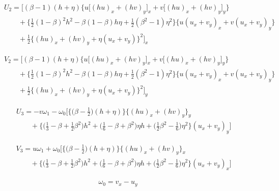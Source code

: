 \documentclass[11pt]{article}
\begin{document}
\begin{eqnarray}
&&U_2=\bigg[
        (\beta-1)(h+\eta) \Big\{
        u \big[ (hu)_x + (hv)_y \big]_x +  v \big[ (hu)_x + (hv)_y \big]_y \Big\}
         \nonumber \\
&& \quad \quad
        +\bigg\{ \frac{1}{2} (1-\beta)^2 h^2 - \beta (1-\beta) h \eta + \frac{1}{2} (\beta^2-1) \eta^2 \bigg\}
        \Big\{ u (u_x+v_y)_x + v(u_x+v_y)_y \Big\}   \nonumber  \\
&& \quad \quad
        +\frac{1}{2} \Big\{
        (hu)_x + (hv)_y + \eta (u_x+v_y)
        \Big\}^2
      \bigg]_x
\end{eqnarray}

\begin{eqnarray}
&&V_2=\bigg[
        (\beta-1)(h+\eta) \Big\{
        u \big[ (hu)_x + (hv)_y \big]_x +  v \big[ (hu)_x + (hv)_y \big]_y \Big\}
         \nonumber \\
&& \quad \quad
        +\bigg\{ \frac{1}{2} (1-\beta)^2 h^2 - \beta (1-\beta) h \eta + \frac{1}{2} (\beta^2-1) \eta^2 \bigg\}
        \Big\{ u (u_x+v_y)_x + v(u_x+v_y)_y \Big\}   \nonumber  \\
&& \quad \quad
        +\frac{1}{2} \Big\{
        (hu)_x + (hv)_y + \eta (u_x+v_y)
        \Big\}^2
      \bigg]_y
\end{eqnarray}

\begin{eqnarray}
&&U_3=-v \omega_1 - \omega_0 \bigg[ \Big\{ \big(
      \beta - \frac{1}{2} \big) (h+\eta) \Big\}
      \Big\{ (hu)_x + (hv)_y \Big\}_y   \nonumber \\
&& \quad \quad
      +
      \Big\{
        \big( \frac{1}{3} - \beta + \frac{1}{2} \beta^2 \big) h^2
      + \big( \frac{1}{6} - \beta + \beta^2 \big) \eta h
      + \big( \frac{1}{2} \beta^2 - \frac{1}{6} \big) \eta^2
      \Big\}
      (u_x+v_y)_y
      \bigg]
\end{eqnarray}

\begin{eqnarray}
&&V_3=u \omega_1 + \omega_0 \bigg[ \Big\{ \big(
      \beta - \frac{1}{2} \big) (h+\eta) \Big\}
      \Big\{ (hu)_x + (hv)_y \Big\}_x   \nonumber \\
&& \quad \quad
      +
      \Big\{
        \big( \frac{1}{3} - \beta + \frac{1}{2} \beta^2 \big) h^2
      + \big( \frac{1}{6} - \beta + \beta^2 \big) \eta h
      + \big( \frac{1}{2} \beta^2 - \frac{1}{6} \big) \eta^2
      \Big\}
      (u_x+v_y)_x
      \bigg]
\end{eqnarray}

\begin{eqnarray}
\omega_0 = v_x - u_y
\end{eqnarray}
\end{document}
